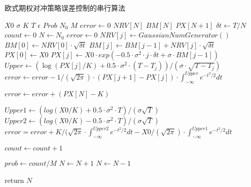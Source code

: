 \begin{algorithm}
  \caption{欧式期权对冲策略误差控制的串行算法}
  \label{alg:bserror}
	\begin{algorithmic}[1]
	 \Require $X0$ 
	 \Require $\sigma$ 
	 \Require $K$ 
	 \Require $T$ 
	 \Require $\epsilon$ 
	 \Require $Prob$ 
         \Require $N_{0}$ 
         \Require $M$ 
         \State $error \gets 0$ 
         \State $NRV[N]$ 
         \State $BM[N]$ 
         \State $PX[N+1]$ 
	 \State $\delta t \gets T/N$ 
	 \State $count \gets 0$ 
         \State $N \gets N_0$
	   
          \State $error \gets 0$ 
	     $NRV[j] \gets GaussianNumGenerator()$
	  \EndFor
	  \State $BM[0] \gets NRV[0] \cdot \sqrt{\delta t}$ 
	     $BM[j] \gets BM[j-1] + NRV[j]\cdot \sqrt{\delta t}$ 
	  \EndFor
	  \State $PX[0] \gets X0$
	  \State $PX[j]\gets X0 \cdot exp(-0.5\cdot \sigma^2 \cdot j \cdot \delta t + \sigma \cdot BM[j-1])$
	  \EndFor
	  \State $Upper \gets (\log(PX[j]/K) + 0.5\cdot \sigma^2 \cdot (T- T_j))/ (\sigma \cdot \sqrt{T-T_j})$ 
	  \State $error \gets error - 1/(\sqrt{2\pi}) \cdot (PX[j+1]-PX[j])\cdot \int_{-\infty}^{Upper}e^{-t^2/2}dt $
	  \EndFor

	  \State $error \gets error + (PX[N]-K)$
	  \EndIf

	  \State $Upper1 \gets (log(X0/K) + 0.5\cdot \sigma^2 \cdot T)/(\sigma \sqrt{T})$
	  \State $Upper2 \gets (log(X0/K) - 0.5\cdot \sigma^2 \cdot T)/(\sigma \sqrt{T})$
	  \State $error = error + K/(\sqrt{2\pi} \cdot \int_{-\infty}^{Upper2}e^{-t^2/2}dt -X0/(\sqrt{2\pi})\cdot \int_{-\infty}^{Upper1}e^{-t^2/2}dt$
	  
	  \State $count \gets count + 1$ 
	  \EndIf
	  \EndFor

	  \State $prob \gets count/M$
	  \State $N \gets N + 1$
	  \Else
	  \State $N \gets N - 1$
	  \EndIf

	  \State return $N$
	 \EndProcedure
  \end{algorithmic}
\end{algorithm}






